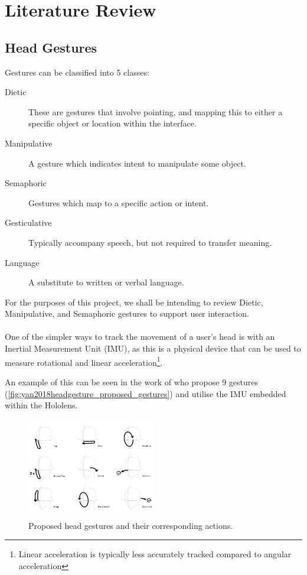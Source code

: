 \section{Literature Review}

\subsection{Head Gestures}

Gestures can be classified into 5 classes\cite{karam2005taxonomy}:
\begin{description}
    \item[Dietic] These are gestures that involve pointing, and mapping this to either a specific object or location within the interface.
    \item[Manipulative] A gesture which indicates intent to manipulate some object.
    \item[Semaphoric] Gestures which map to a specific action or intent.
    \item[Gesticulative] Typically accompany speech, but not required to transfer meaning.
    \item[Language] A substitute to written or verbal language.
\end{description}
For the purposes of this project, we shall be intending to review Dietic, Manipulative, and Semaphoric gestures to support user interaction.
\\\\
One of the simpler ways to track the movement of a user's head is with an Inertial Measurement Unit
 (IMU), as this is a physical device that can be used to measure rotational and linear acceleration\footnote{Linear acceleration is typically less accurately tracked compared to angular acceleration}.

An example of this can be seen in the work of \citeauthor{yan2018headgesture} who propose 9 gestures (\autoref{fig:yan2018headgesture_proposed_gestures}) and utilise the IMU embedded within the Hololens\cite{yan2018headgesture}.
\begin{figure}
    \centering
    \includegraphics[width=0.5\textwidth]{figures/yan2018headgesture_fig2_proposed_gestures.png}
    \caption{\label{fig:yan2018headgesture_proposed_gestures} Proposed head gestures and their corresponding actions\cite{yan2018headgesture}.}
\end{figure}

